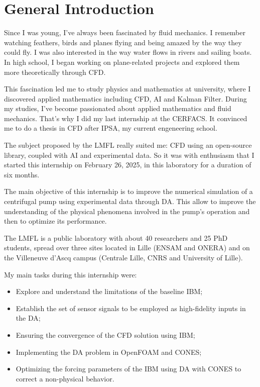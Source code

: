 \section*{General Introduction}

Since I was young, I've always been fascinated by fluid mechanics.
I remember watching feathers, birds and planes flying and being amazed by the way they could fly.
I was also interested in the way water flows in rivers and sailing boats. In high school, I began working on plane-related projects and explored them more theoretically through \ac{CFD}.

This fascination led me to study physics and mathematics at university, where I discovered applied mathematics including CFD, \ac{AI} and Kalman Filter.
During my studies, I've become passionated about applied mathematics and fluid mechanics. That's why I did my last internship at the \ac{CERFACS}.
It convinced me to do a thesis in CFD after \ac{IPSA}, my current engeneering school.

The subject proposed by the \ac{LMFL} really suited me: CFD using an open-source library, coupled with AI and experimental data. So it was with enthusiasm that I started this internship on February 26, 2025, in this laboratory for a duration of six months.

The main objective of this internship is to improve the numerical simulation of a centrifugal pump using experimental data through \ac{DA}. This allow to improve the understanding of the physical phenomena involved in the pump's operation and then to optimize its performance.

The LMFL is a public laboratory with about 40 researchers and 25 PhD students, spread over three sites located in Lille (\ac{ENSAM} and \ac{ONERA}) and on the Villeneuve d'Ascq campus (Centrale Lille, \ac{CNRS} and University of Lille).

My main tasks during this internship were:

\vspace{-0.15cm}

\begin{itemize}\setlength\itemsep{0.1em}
    \item Explore and understand the limitations of the baseline \ac{IBM};
    \item Establish the set of sensor signals to be employed as high-fidelity inputs in the DA;
    \item Ensuring the convergence of the CFD solution using IBM;
    \item Implementing the DA problem in \ac{OpenFOAM} and \ac{CONES};
    \item Optimizing the forcing parameters of the IBM using DA with CONES to correct a non-physical behavior.
\end{itemize}

